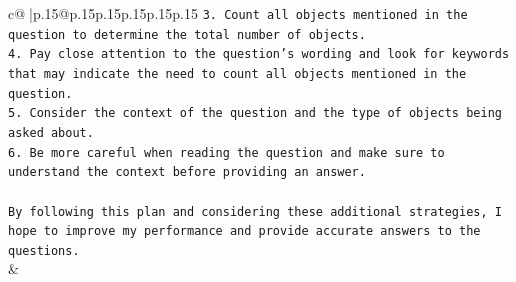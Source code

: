 \documentclass{article}
\begin{document}
{\begin{supertabular}{c@{$\;$}|p{.15\linewidth}@{}p{.15\linewidth}p{.15\linewidth}p{.15\linewidth}p{.15\linewidth}p{.15\linewidth}}
{{{\texttt{3. Count all objects mentioned in the question to determine the total number of objects.} \\
\texttt{4. Pay close attention to the question's wording and look for keywords that may indicate the need to count all objects mentioned in the question.} \\
\texttt{5. Consider the context of the question and the type of objects being asked about.} \\
\texttt{6. Be more careful when reading the question and make sure to understand the context before providing an answer.} \\
\\ 
\texttt{By following this plan and considering these additional strategies, I hope to improve my performance and provide accurate answers to the questions.} \\
            }
        }
    }
    & \\ \\

\end{supertabular}
}
\end{document}
